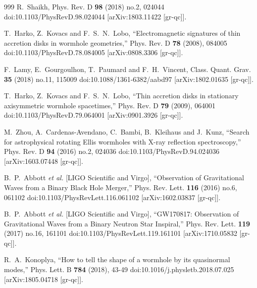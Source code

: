 \documentclass[aps,preprint,groupedaddress,nofootinbib,superscriptaddress,showkeys,showpacs,eqsecnum,amsmath,amssymb]{revtex4-1}
\begin{document}
\begin{thebibliography}{999}
R.~Shaikh,
Phys. Rev. D \textbf{98} (2018) no.2, 024044
doi:10.1103/PhysRevD.98.024044
[arXiv:1803.11422 [gr-qc]].

T.~Harko, Z.~Kovacs and F.~S.~N.~Lobo,
``Electromagnetic signatures of thin accretion disks in wormhole geometries,''
Phys. Rev. D \textbf{78} (2008), 084005
doi:10.1103/PhysRevD.78.084005
[arXiv:0808.3306 [gr-qc]].

F.~Lamy, E.~Gourgoulhon, T.~Paumard and F.~H.~Vincent,
Class. Quant. Grav. \textbf{35} (2018) no.11, 115009
doi:10.1088/1361-6382/aabd97
[arXiv:1802.01635 [gr-qc]].

T.~Harko, Z.~Kovacs and F.~S.~N.~Lobo,
``Thin accretion disks in stationary axisymmetric wormhole spacetimes,''
Phys. Rev. D \textbf{79} (2009), 064001
doi:10.1103/PhysRevD.79.064001
[arXiv:0901.3926 [gr-qc]].

M.~Zhou, A.~Cardenas-Avendano, C.~Bambi, B.~Kleihaus and J.~Kunz,
``Search for astrophysical rotating Ellis wormholes with X-ray reflection spectroscopy,''
Phys. Rev. D \textbf{94} (2016) no.2, 024036
doi:10.1103/PhysRevD.94.024036
[arXiv:1603.07448 [gr-qc]].

B.~P.~Abbott \textit{et al.} [LIGO Scientific and Virgo],
``Observation of Gravitational Waves from a Binary Black Hole Merger,''
Phys. Rev. Lett. \textbf{116} (2016) no.6, 061102
doi:10.1103/PhysRevLett.116.061102
[arXiv:1602.03837 [gr-qc]].

B.~P.~Abbott \textit{et al.} [LIGO Scientific and Virgo],
``GW170817: Observation of Gravitational Waves from a Binary Neutron Star Inspiral,''
Phys. Rev. Lett. \textbf{119} (2017) no.16, 161101
doi:10.1103/PhysRevLett.119.161101
[arXiv:1710.05832 [gr-qc]].

R.~A.~Konoplya,
``How to tell the shape of a wormhole by its quasinormal modes,''
Phys. Lett. B \textbf{784} (2018), 43-49
doi:10.1016/j.physletb.2018.07.025
[arXiv:1805.04718 [gr-qc]].


\end{thebibliography}
\end{document}
